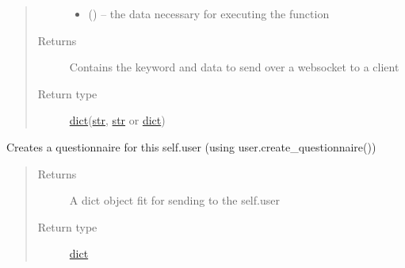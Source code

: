 \documentclass[letterpaper,10pt,english]{sphinxmanual}
\begin{document}
\begin{fulllineitems}
\begin{fulllineitems}
\begin{quote}
\begin{description}
\begin{itemize}
\item {} 
 (\href{https://docs.python.org/2/library/stdtypes.html\#dict}{}\sphinxstyleliteralemphasis{(}\href{https://docs.python.org/2/library/functions.html\#str}{}\sphinxstyleliteralemphasis{, }\href{https://docs.python.org/2/library/functions.html\#str}{}\href{https://docs.python.org/2/library/stdtypes.html\#dict}{}\sphinxstyleliteralemphasis{)}\sphinxstyleliteralemphasis{}) -- the data necessary for executing the function

\end{itemize}

\item[{Returns}] \leavevmode
Contains the keyword and data to send over a websocket to a client

\item[{Return type}] \leavevmode
\href{https://docs.python.org/2/library/stdtypes.html\#dict}{dict}(\href{https://docs.python.org/2/library/functions.html\#str}{str}, \href{https://docs.python.org/2/library/functions.html\#str}{str} or \href{https://docs.python.org/2/library/stdtypes.html\#dict}{dict})

\end{description}\end{quote}

\end{fulllineitems}


\begin{fulllineitems}
\label{\detokenize{consumer:consumer.Consumer.create_questionnaire}}
Creates a questionnaire for this self.user (using user.create\_questionnaire())
\begin{quote}\begin{description}
\item[{Returns}] \leavevmode
A dict object fit for sending to the self.user

\item[{Return type}] \leavevmode
\href{https://docs.python.org/2/library/stdtypes.html\#dict}{dict}

\end{description}\end{quote}


\end{fulllineitems}
\end{fulllineitems}
\end{document}
